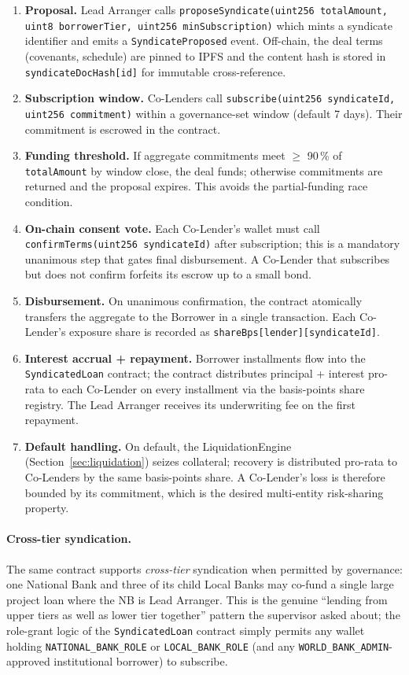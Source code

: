 \documentclass[12pt,a4paper]{report}
\begin{document}
\begin{enumerate}[noitemsep]
\item \textbf{Proposal.} Lead Arranger calls \texttt{proposeSyndicate(uint256 totalAmount, uint8 borrowerTier, uint256 minSubscription)} which mints a syndicate identifier and emits a \texttt{SyndicateProposed} event. Off-chain, the deal terms (covenants, schedule) are pinned to IPFS and the content hash is stored in \texttt{syndicateDocHash[id]} for immutable cross-reference.
\item \textbf{Subscription window.} Co-Lenders call \texttt{subscribe(uint256 syndicateId, uint256 commitment)} within a governance-set window (default 7 days). Their commitment is escrowed in the contract.
\item \textbf{Funding threshold.} If aggregate commitments meet $\ge$ 90\,\% of \texttt{totalAmount} by window close, the deal funds; otherwise commitments are returned and the proposal expires. This avoids the partial-funding race condition.
\item \textbf{On-chain consent vote.} Each Co-Lender's wallet must call \texttt{confirmTerms(uint256 syndicateId)} after subscription; this is a mandatory unanimous step that gates final disbursement. A Co-Lender that subscribes but does not confirm forfeits its escrow up to a small bond.
\item \textbf{Disbursement.} On unanimous confirmation, the contract atomically transfers the aggregate to the Borrower in a single transaction. Each Co-Lender's exposure share is recorded as \texttt{shareBps[lender][syndicateId]}.
\item \textbf{Interest accrual + repayment.} Borrower installments flow into the \texttt{SyndicatedLoan} contract; the contract distributes principal + interest pro-rata to each Co-Lender on every installment via the basis-points share registry. The Lead Arranger receives its underwriting fee on the first repayment.
\item \textbf{Default handling.} On default, the LiquidationEngine (Section~\ref{sec:liquidation}) seizes collateral; recovery is distributed pro-rata to Co-Lenders by the same basis-points share. A Co-Lender's loss is therefore bounded by its commitment, which is the desired multi-entity risk-sharing property.
\end{enumerate}

\paragraph{Cross-tier syndication.}
The same contract supports \emph{cross-tier} syndication when permitted by governance: one National Bank and three of its child Local Banks may co-fund a single large project loan where the NB is Lead Arranger. This is the genuine ``lending from upper tiers as well as lower tier together'' pattern the supervisor asked about; the role-grant logic of the \texttt{SyndicatedLoan} contract simply permits any wallet holding \texttt{NATIONAL\_BANK\_ROLE} or \texttt{LOCAL\_BANK\_ROLE} (and any \texttt{WORLD\_BANK\_ADMIN}-approved institutional borrower) to subscribe.
\end{document}
